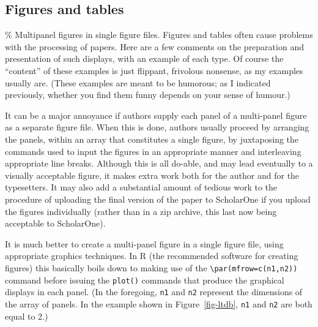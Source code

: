 \documentclass[
  times,
  doublespace]{anzsauth}
\begin{document}
\subsection{Figures and tables}\label{sec-figAndTab}

\% Multipanel figures in single figure files. Figures and tables often
cause problems with the processing of papers. Here are a few comments on
the preparation and presentation of such displays, with an example of
each type. Of course the ``content'' of these examples is just flippant,
frivolous nonsense, as my examples usually are. (These examples are
meant to be humorous; as I indicated previously, whether you find them
funny depends on your sense of humour.)

It can be a major annoyance if authors supply each panel of a
multi-panel figure as a separate figure file. When this is done, authors
usually proceed by arranging the panels, within an array that
constitutes a single figure, by juxtaposing the commands used to input
the figures in an appropriate manner and interleaving appropriate line
breaks. Although this is all do-able, and may lead eventually to a
visually acceptable figure, it makes extra work both for the author and
for the typesetters. It may also add a substantial amount of tedious
work to the procedure of uploading the final version of the paper to
ScholarOne if you upload the figures individually (rather than in a zip
archive, this last now being acceptable to ScholarOne).

It is much better to create a multi-panel figure in a single figure
file, using appropriate graphics techniques. In \textsf{R} (the
recommended software for creating figures) this basically boils down to
making use of the \texttt{\textbackslash{}par(mfrow=c(n1,n2))} command
before issuing the \texttt{plot()} commands that produce the graphical
displays in each panel. (In the foregoing, \texttt{n1} and \texttt{n2}
represent the dimensions of the array of panels. In the example shown in
Figure~\ref{fig-ltdb}, \texttt{n1} and \texttt{n2} are both equal to 2.)
\end{document}

